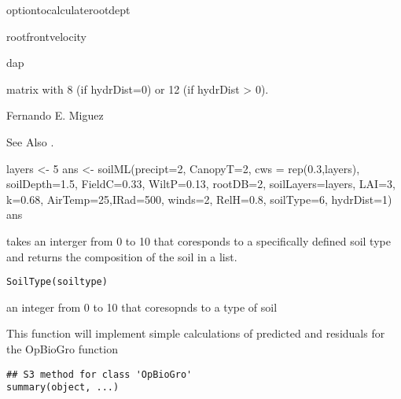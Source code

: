 \documentclass[letterpaper]{book}
\begin{document}
%
\begin{Value}
optiontocalculaterootdept

rootfrontvelocity

dap

matrix with 8 (if hydrDist=0) or 12 (if hydrDist > 0).
\end{Value}
%
\begin{Author}\relax
Fernando E. Miguez
\end{Author}
%
\begin{SeeAlso}\relax
See Also .
\end{SeeAlso}
%
\begin{Examples}
\begin{ExampleCode}
layers <- 5
ans <- soilML(precipt=2, CanopyT=2, cws = rep(0.3,layers),
soilDepth=1.5, FieldC=0.33, WiltP=0.13, rootDB=2, soilLayers=layers,
LAI=3, k=0.68, AirTemp=25,IRad=500, winds=2, RelH=0.8, soilType=6,
hydrDist=1)
ans
\end{ExampleCode}
\end{Examples}
%
\begin{Description}\relax
takes an interger from 0 to 10 that coresponds to a
specifically defined soil type and returns the composition
of the soil in a list.
\end{Description}
%
\begin{Usage}
\begin{verbatim}
SoilType(soiltype)
\end{verbatim}
\end{Usage}
%
\begin{Arguments}
\begin{ldescription}
\item[\code{soiltype}] an integer from 0 to 10 that coresopnds
to a type of soil
\end{ldescription}
\end{Arguments}
%
\begin{Description}\relax
This function will implement simple calculations of
predicted and residuals for the OpBioGro function
\end{Description}
%
\begin{Usage}
\begin{verbatim}
## S3 method for class 'OpBioGro'
summary(object, ...)
\end{verbatim}
\end{Usage}
\end{document}
